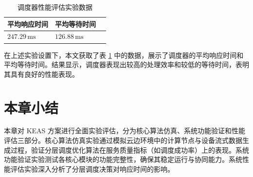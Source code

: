 \begin{table}[ht]
    \renewcommand{\arraystretch}{1.5}
    \centering
    \caption{调度器性能评估实验数据}
    \label{tab:performance}
    \begin{tabular}{lll}
        \toprule
        \textbf{平均响应时间} & \textbf{平均等待时间} \\
        \midrule
        $247.29 \, \text{ms}$ & $126.88 \, \text{ms}$  \\ 
        \bottomrule
    \end{tabular}
\end{table}

在上述实验设置下，本文获取了表 \ref{tab:performance} 中的数据，展示了调度器的平均响应时间和平均等待时间。结果显示，调度器表现出较高的处理效率和较低的等待时间，表明其具有良好的性能表现。

\section{本章小结}

本章对 KEAS 方案进行全面实验评估，分为核心算法仿真、系统功能验证和性能评估三部分。核心算法仿真实验通过模拟云边环境中的计算节点与设备流式数据生成过程，验证分层调度优化算法在服务质量指标（如调度成功率）上的表现。系统功能验证实验测试各核心模块的功能完整性，确保其稳定运行与协同能力。系统性能评估实验深入分析了分层调度决策对响应时间的影响。
